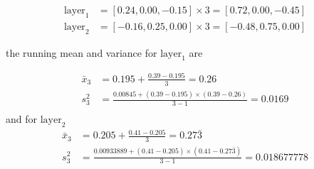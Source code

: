 \documentclass[10pt, a4paper]{article}
\begin{document}
	\begin{align*}
	\text{layer}_1 &= [ 0.24, 0.00, -0.15] \times 3 = [ 0.72, 0.00, -0.45] \\
	\text{layer}_2 &= [-0.16, 0.25, 0.00] \times 3 = [-0.48, 0.75, 0.00]
	\end{align*}
	
	the running mean and variance for $\text{layer}_1$ are
	
	\begin{align*}
	\bar{x}_{3} &= 0.195 + \frac{0.39 - 0.195}{3} = 0.26 \\
	s^2_{3} &= \frac{0.00845 + (0.39 - 0.195)\times(0.39 - 0.26)}{3 - 1} = 0.0169\\
	\end{align*}
	and for $\text{layer}_2$
	\begin{align*}
	\bar{x}_{3} &= 0.205 + \frac{0.41 - 0.205}{3} = 0.27\bar{3} \\
	s^2_{3} &= \frac{0.00933889 + (0.41 - 0.205)\times(0.41 - 0.27\bar{3})}{3 - 1} = 0.018677778
	\end{align*}
	
	
	
\end{document}
